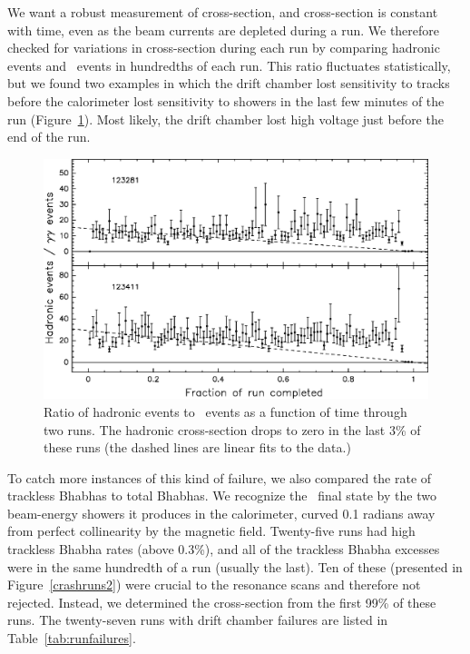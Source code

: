 \documentclass{cornell}
\begin{document}
We want a robust measurement of cross-section, and cross-section is
constant with time, even as the beam currents are depleted during a
run.  We therefore checked for variations in cross-section during each
run by comparing hadronic events and \gamgam\ events in hundredths of
each run.  This ratio fluctuates statistically, but we found two
examples in which the drift chamber lost sensitivity to tracks before
the calorimeter lost sensitivity to showers in the last few minutes of
the run (Figure~\ref{crashruns}).  Most likely, the drift chamber lost
high voltage just before the end of the run.

\begin{figure}[p]
  \begin{center}
    \includegraphics[width=\linewidth]{crashruns}
  \end{center}
  \caption[Two runs in which the hadronic cross-section dropped at the
  end of the run]{\label{crashruns} Ratio of hadronic events to \gamgam\ events
  as a function of time through two runs.  The hadronic cross-section
  drops to zero in the last 3\% of these runs (the dashed lines are
  linear fits to the data.)}
\end{figure}

To catch more instances of this kind of failure, we also compared the
rate of trackless Bhabhas to total Bhabhas.  We recognize the \ee\
final state by the two beam-energy showers it produces in the
calorimeter, curved 0.1 radians away from perfect collinearity by the
magnetic field.  Twenty-five runs had high trackless Bhabha rates
(above 0.3\%), and all of the trackless Bhabha excesses were in the
same hundredth of a run (usually the last).  Ten of these (presented
in Figure~\ref{crashruns2}) were crucial to the resonance scans and
therefore not rejected.  Instead, we determined the cross-section from
the first 99\% of these runs.  The twenty-seven runs with drift
chamber failures are listed in Table~\ref{tab:runfailures}.
\end{document}
